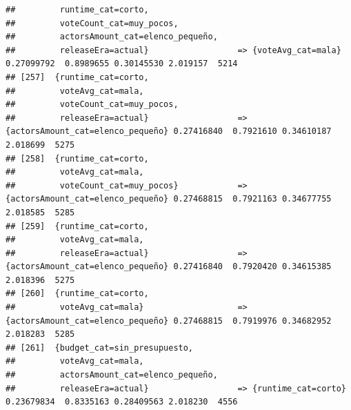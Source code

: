 \documentclass[
]{article}
\begin{document}
\begin{verbatim}
##         runtime_cat=corto,                                                                                                      
##         voteCount_cat=muy_pocos,                                                                                                
##         actorsAmount_cat=elenco_pequeño,                                                                                        
##         releaseEra=actual}                  => {voteAvg_cat=mala}                0.27099792  0.8989655 0.30145530 2.019157  5214
## [257]  {runtime_cat=corto,                                                                                                      
##         voteAvg_cat=mala,                                                                                                       
##         voteCount_cat=muy_pocos,                                                                                                
##         releaseEra=actual}                  => {actorsAmount_cat=elenco_pequeño} 0.27416840  0.7921610 0.34610187 2.018699  5275
## [258]  {runtime_cat=corto,                                                                                                      
##         voteAvg_cat=mala,                                                                                                       
##         voteCount_cat=muy_pocos}            => {actorsAmount_cat=elenco_pequeño} 0.27468815  0.7921163 0.34677755 2.018585  5285
## [259]  {runtime_cat=corto,                                                                                                      
##         voteAvg_cat=mala,                                                                                                       
##         releaseEra=actual}                  => {actorsAmount_cat=elenco_pequeño} 0.27416840  0.7920420 0.34615385 2.018396  5275
## [260]  {runtime_cat=corto,                                                                                                      
##         voteAvg_cat=mala}                   => {actorsAmount_cat=elenco_pequeño} 0.27468815  0.7919976 0.34682952 2.018283  5285
## [261]  {budget_cat=sin_presupuesto,                                                                                             
##         voteAvg_cat=mala,                                                                                                       
##         actorsAmount_cat=elenco_pequeño,                                                                                        
##         releaseEra=actual}                  => {runtime_cat=corto}               0.23679834  0.8335163 0.28409563 2.018230  4556

\end{verbatim}
\end{document}
